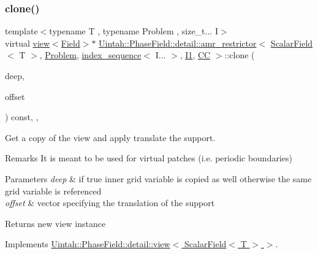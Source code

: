 \subsubsection{\texorpdfstring{clone()}{clone()}\hspace{0.1cm}{\footnotesize\ttfamily [2/2]}}
{\footnotesize\ttfamily template$<$typename T , typename Problem , size\+\_\+t... I$>$ \\
virtual \hyperlink{classUintah_1_1PhaseField_1_1detail_1_1view}{view}$<$\hyperlink{structUintah_1_1PhaseField_1_1ScalarField}{Field}$>$$\ast$ \hyperlink{classUintah_1_1PhaseField_1_1detail_1_1amr__restrictor}{Uintah\+::\+Phase\+Field\+::detail\+::amr\+\_\+restrictor}$<$ \hyperlink{structUintah_1_1PhaseField_1_1ScalarField}{Scalar\+Field}$<$ T $>$, \hyperlink{classUintah_1_1PhaseField_1_1Problem}{Problem}, \hyperlink{namespaceUintah_1_1PhaseField_a237de804d99512e50613aff7c94a9461}{index\+\_\+sequence}$<$ I... $>$, \hyperlink{namespaceUintah_1_1PhaseField_a547ce3002aa97fbd3ef3192a6eec8406a66f19efe774b0d2b6e5844eb2d83d305}{I1}, \hyperlink{namespaceUintah_1_1PhaseField_a33d355affda78a83f45755ba8388cedda22303704507d024d1d6508ed9859a85a}{CC} $>$\+::clone (\begin{DoxyParamCaption}\item[{bool}]{deep,  }\item[{const Int\+Vector \&}]{offset }\end{DoxyParamCaption}) const\hspace{0.3cm}{\ttfamily [inline]}, {\ttfamily [override]}, {\ttfamily [virtual]}}



Get a copy of the view and apply translate the support. 

\begin{DoxyRemark}{Remarks}
It is meant to be used for virtual patches (i.\+e. periodic boundaries)
\end{DoxyRemark}

\begin{DoxyParams}{Parameters}
{\em deep} & if true inner grid variable is copied as well otherwise the same grid variable is referenced \\
\hline
{\em offset} & vector specifying the translation of the support \\
\hline
\end{DoxyParams}
\begin{DoxyReturn}{Returns}
new view instance 
\end{DoxyReturn}


Implements \hyperlink{classUintah_1_1PhaseField_1_1detail_1_1view_3_01ScalarField_3_01T_01_4_01_4_abd928104240e329f3bc4441ebab7c50c}{Uintah\+::\+Phase\+Field\+::detail\+::view$<$ Scalar\+Field$<$ T $>$ $>$}.

